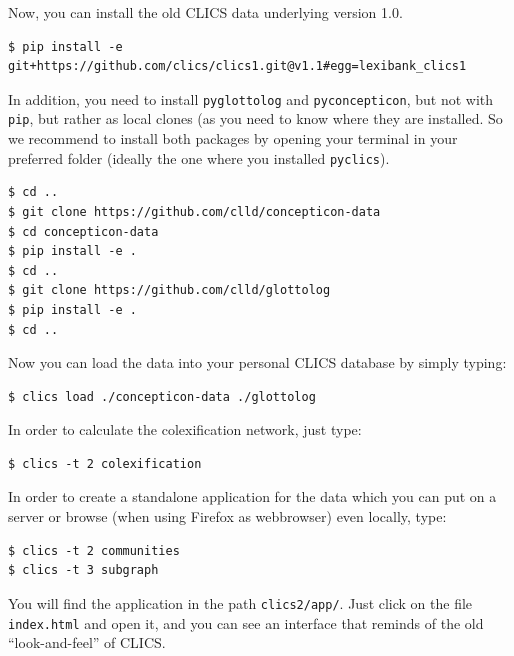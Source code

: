 \documentclass[
  english,
  a4paper,
  oneside,tablecaptionabove
]{scrbook}
\newcommand{\passthrough}[1]{#1}
\begin{document}
Now, you can install the old CLICS data underlying version 1.0.

\begin{lstlisting}
$ pip install -e git+https://github.com/clics/clics1.git@v1.1#egg=lexibank_clics1
\end{lstlisting}

In addition, you need to install \passthrough{\lstinline!pyglottolog!}
and \passthrough{\lstinline!pyconcepticon!}, but not with
\passthrough{\lstinline!pip!}, but rather as local clones (as you need
to know where they are installed. So we recommend to install both
packages by opening your terminal in your preferred folder (ideally the
one where you installed \passthrough{\lstinline!pyclics!}).

\begin{lstlisting}
$ cd ..
$ git clone https://github.com/clld/concepticon-data
$ cd concepticon-data
$ pip install -e .
$ cd ..
$ git clone https://github.com/clld/glottolog
$ pip install -e .
$ cd ..
\end{lstlisting}

Now you can load the data into your personal CLICS database by simply
typing:

\begin{lstlisting}
$ clics load ./concepticon-data ./glottolog
\end{lstlisting}

In order to calculate the colexification network, just type:

\begin{lstlisting}
$ clics -t 2 colexification
\end{lstlisting}

In order to create a standalone application for the data which you can
put on a server or browse (when using Firefox as webbrowser) even
locally, type:

\begin{lstlisting}
$ clics -t 2 communities
$ clics -t 3 subgraph
\end{lstlisting}

You will find the application in the path
\passthrough{\lstinline!clics2/app/!}. Just click on the file
\passthrough{\lstinline!index.html!} and open it, and you can see an
interface that reminds of the old \enquote{look-and-feel} of CLICS.
\end{document}
